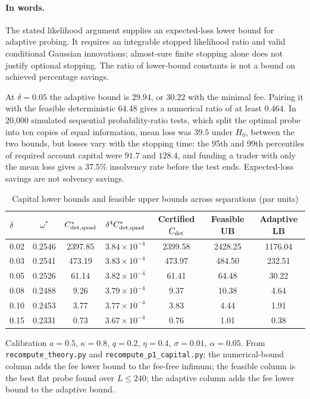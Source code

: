 \documentclass[12pt]{article}
\theoremstyle{definition}
\theoremstyle{remark}
\begin{document}
\paragraph{In words.} The stated likelihood argument supplies an expected-loss lower bound for adaptive probing. It requires an integrable stopped likelihood ratio and valid conditional Gaussian innovations; almost-sure finite stopping alone does not justify optional stopping. The ratio of lower-bound constants is not a bound on achieved percentage savings.

At $\delta=0.05$ the adaptive bound is $29.94$, or $30.22$ with the minimal fee. Pairing it with the feasible deterministic 64.48 gives a numerical ratio of at least $0.464$. In 20{,}000 simulated sequential probability-ratio tests, which split the optimal probe into ten copies of equal information, mean loss was $39.5$ under $H_0$, between the two bounds, but losses vary with the stopping time: the 95th and 99th percentiles of required account capital were $91.7$ and $128.4$, and funding a trader with only the mean loss gives a 37.5\% insolvency rate before the test ends. Expected-loss savings are not solvency savings.

\begin{table}[t]\centering\small
\begin{threeparttable}
\caption{Capital lower bounds and feasible upper bounds across separations (par units)}\label{tab:capbounds}
\begin{tabular}{lcccccc}
\toprule
$\delta$ & $\omega^*$ & $C^*_{\rm det,quad}$ & $\delta^4C^*_{\rm det,quad}$ & Certified $C_{\rm det}$ & Feasible UB & Adaptive LB\\
\midrule
0.02 & 0.2546 & 2397.85 & $3.84\times10^{-4}$ & 2399.58 & 2428.25 & 1176.04\\
0.03 & 0.2541 & 473.19 & $3.83\times10^{-4}$ & 473.97 & 484.50 & 232.51\\
0.05 & 0.2526 & 61.14 & $3.82\times10^{-4}$ & 61.41 & 64.48 & 30.22\\
0.08 & 0.2488 & 9.26 & $3.79\times10^{-4}$ & 9.37 & 10.38 & 4.64\\
0.10 & 0.2453 & 3.77 & $3.77\times10^{-4}$ & 3.83 & 4.44 & 1.91\\
0.15 & 0.2331 & 0.73 & $3.67\times10^{-4}$ & 0.76 & 1.01 & 0.38\\
\bottomrule
\end{tabular}
\begin{tablenotes}\footnotesize\item Calibration $a=0.5$, $\kappa=0.8$, $q=0.2$, $\eta=0.4$, $\sigma=0.01$, $\alpha=0.05$. From \texttt{recompute\_theory.py} and \texttt{recompute\_p1\_capital.py}; the numerical-bound column adds the fee lower bound to the fee-free infimum; the feasible column is the best flat probe found over $L\le240$; the adaptive column adds the fee lower bound to the adaptive bound.\end{tablenotes}
\end{threeparttable}
\end{table}
\end{document}
